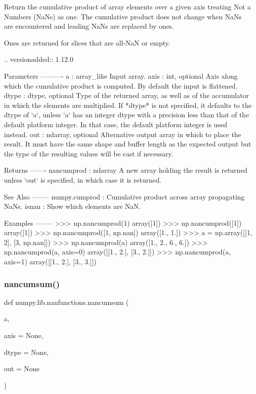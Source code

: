 \begin{DoxyVerb}Return the cumulative product of array elements over a given axis treating Not a
Numbers (NaNs) as one.  The cumulative product does not change when NaNs are
encountered and leading NaNs are replaced by ones.

Ones are returned for slices that are all-NaN or empty.

.. versionadded:: 1.12.0

Parameters
----------
a : array_like
    Input array.
axis : int, optional
    Axis along which the cumulative product is computed.  By default
    the input is flattened.
dtype : dtype, optional
    Type of the returned array, as well as of the accumulator in which
    the elements are multiplied.  If *dtype* is not specified, it
    defaults to the dtype of `a`, unless `a` has an integer dtype with
    a precision less than that of the default platform integer.  In
    that case, the default platform integer is used instead.
out : ndarray, optional
    Alternative output array in which to place the result. It must
    have the same shape and buffer length as the expected output
    but the type of the resulting values will be cast if necessary.

Returns
-------
nancumprod : ndarray
    A new array holding the result is returned unless `out` is
    specified, in which case it is returned.

See Also
--------
numpy.cumprod : Cumulative product across array propagating NaNs.
isnan : Show which elements are NaN.

Examples
--------
>>> np.nancumprod(1)
array([1])
>>> np.nancumprod([1])
array([1])
>>> np.nancumprod([1, np.nan])
array([1.,  1.])
>>> a = np.array([[1, 2], [3, np.nan]])
>>> np.nancumprod(a)
array([1.,  2.,  6.,  6.])
>>> np.nancumprod(a, axis=0)
array([[1.,  2.],
       [3.,  2.]])
>>> np.nancumprod(a, axis=1)
array([[1.,  2.],
       [3.,  3.]])\end{DoxyVerb}
 \mbox{\label{namespacenumpy_1_1lib_1_1nanfunctions_abda36044421269514fdf5636cddb32a0}} 
\subsubsection{\texorpdfstring{nancumsum()}{nancumsum()}}
{\footnotesize\ttfamily def numpy.\+lib.\+nanfunctions.\+nancumsum (\begin{DoxyParamCaption}\item[{}]{a,  }\item[{}]{axis = {\ttfamily None},  }\item[{}]{dtype = {\ttfamily None},  }\item[{}]{out = {\ttfamily None} }\end{DoxyParamCaption})}

